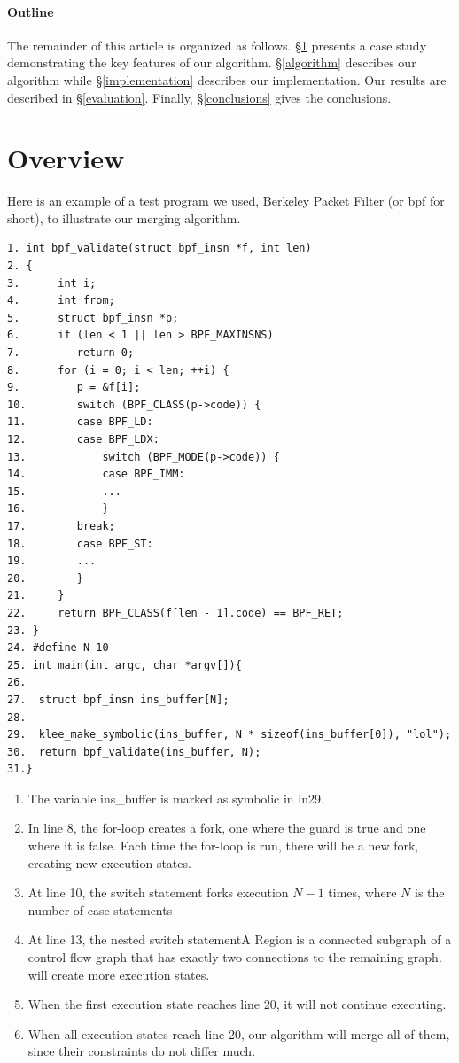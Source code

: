 \documentclass[12pt,a4paper]{article}
\begin{document}
\paragraph{Outline}

The remainder of this article is organized as follows. \S\ref{overview} presents a case study demonstrating the key features of our algorithm. \S\ref{algorithm} describes our algorithm while \S\ref{implementation} describes our implementation. Our results are described in \S\ref{evaluation}. Finally, \S\ref{conclusions} gives the conclusions.

\section{Overview}\label{overview}
Here is an example of a test program we used, Berkeley Packet Filter (or bpf for short), to illustrate our merging algorithm.

\begin{verbatim}
1. int bpf_validate(struct bpf_insn *f, int len)
2. {
3.      int i;
4.      int from;
5.      struct bpf_insn *p;
6.      if (len < 1 || len > BPF_MAXINSNS)
7.         return 0;
8.      for (i = 0; i < len; ++i) {
9.         p = &f[i];
10.        switch (BPF_CLASS(p->code)) {
11.        case BPF_LD:
12.        case BPF_LDX:
13.            switch (BPF_MODE(p->code)) {
14.            case BPF_IMM:
15.            ...
16.            }
17.        break;
18.        case BPF_ST:
19.        ...
20.        }
21.     }
22.     return BPF_CLASS(f[len - 1].code) == BPF_RET;
23. }
24. #define N 10 
25. int main(int argc, char *argv[]){  
26.
27.  struct bpf_insn ins_buffer[N];
28.
29.  klee_make_symbolic(ins_buffer, N * sizeof(ins_buffer[0]), "lol");
30.  return bpf_validate(ins_buffer, N);
31.}
\end{verbatim}

\begin{enumerate}
\item The variable ins\_buffer is marked as symbolic in ln29. 
\item In line 8, the for-loop creates a fork, one where the guard is true and one where it is false. Each time the for-loop is run, there will be a new fork, creating new execution states. 
\item At line 10, the switch statement forks execution $N-1$ times, where $N$ is the number of case statements
\item At line 13, the nested switch statementA Region is a connected subgraph of a control flow graph that has exactly two connections to the remaining graph. will create more execution states. 
\item When the first execution state reaches line 20, it will not continue executing.
\item When all execution states reach line 20, our algorithm will merge all of them, since their constraints do not differ much.
\end{enumerate}
\end{document}

